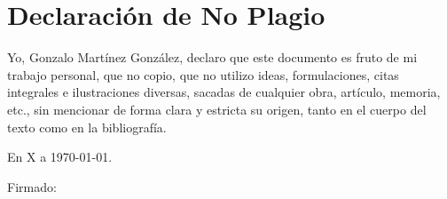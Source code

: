 %
\newpage
{}%
\chapter*{Declaración de No Plagio}
Yo, Gonzalo Martínez González, declaro que este documento es fruto de mi trabajo personal, que no copio, que no utilizo ideas, formulaciones, citas integrales e ilustraciones diversas, sacadas de cualquier obra, artículo, memoria, etc., sin mencionar de forma clara y estricta su origen, tanto en el cuerpo del texto como en la bibliografía.

En X a \today.

Firmado:
%